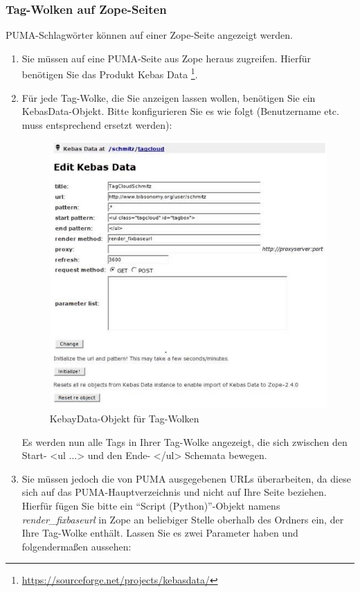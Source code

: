 \subsubsection*{Tag-Wolken auf Zope-Seiten} \label{sss:zopeTagwolken}
PUMA-Schlagwörter können auf einer Zope-Seite angezeigt werden. 
\begin{enumerate}
    \item Sie müssen auf eine PUMA-Seite aus Zope heraus zugreifen. Hierfür benötigen Sie das Produkt Kebas Data \footnote{\url{https://sourceforge.net/projects/kebasdata/}}.
    \item Für jede Tag-Wolke, die Sie anzeigen lassen wollen, benötigen Sie ein KebasData-Objekt. Bitte konfigurieren Sie es wie folgt (Benutzername etc. muss entsprechend ersetzt werden):
  
\begin{figure}[h!]
 \centering
 \includegraphics[width=11cm]{Bilder/tag_wolken.jpg}
 \caption{KebayData-Objekt für Tag-Wolken}
 \label{fig:kebayDataObjekt}
\end{figure}

    Es werden nun alle Tags in Ihrer Tag-Wolke angezeigt, die sich zwischen den Start- <ul ...> und den Ende- </ul> Schemata bewegen.
    \item Sie müssen jedoch die von PUMA ausgegebenen URLs überarbeiten, da diese sich auf das PUMA-Hauptverzeichnis und nicht auf Ihre Seite beziehen. Hierfür fügen Sie bitte ein \enquote{Script (Python)}-Objekt namens \textit{render\_fixbaseurl} in Zope an beliebiger Stelle oberhalb des Ordners ein, der Ihre Tag-Wolke enthält. Lassen Sie es zwei Parameter haben und folgendermaßen aussehen: 


\end{enumerate}
